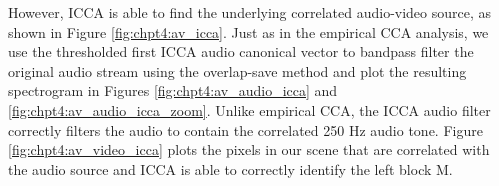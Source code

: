 However, ICCA is able to find the underlying correlated audio-video source, as shown in
Figure \ref{fig:chpt4:av_icca}.  Just as in the empirical CCA analysis, we use the
thresholded first ICCA audio canonical vector to bandpass filter the original audio stream
using the overlap-save method and plot the resulting spectrogram in Figures
\ref{fig:chpt4:av_audio_icca} and \ref{fig:chpt4:av_audio_icca_zoom}. Unlike empirical
CCA, the ICCA audio filter correctly filters the audio to contain the correlated 250 Hz
audio tone. Figure \ref{fig:chpt4:av_video_icca} plots the pixels in our scene that are
correlated with the audio source and ICCA is able to correctly identify the left block M.

\begin{figure}
  \begin{center}
\end{center}
\end{figure}

